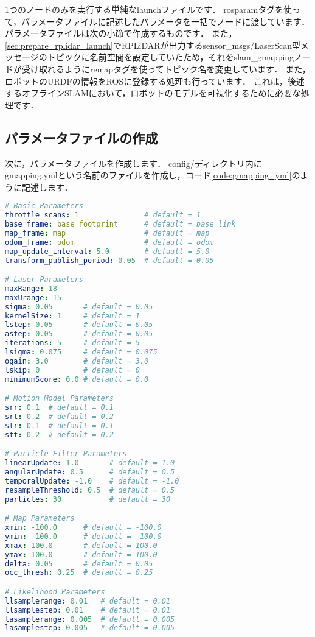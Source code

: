 \documentclass[{../../master}]{subfiles}
\begin{document}
1つのノードのみを実行する単純なlaunchファイルです．
\textsf{rosparam}タグを使って，パラメータファイルに記述したパラメータを一括でノードに渡しています．
パラメータファイルは次の小節で作成するものです．
また，\ref{sec:prepare_rplidar_launch}でRPLiDARが出力する\textsf{sensor\_msgs/LaserScan}型メッセージのトピックに名前空間を設定していたため，それを\textsf{slam\_gmapping}ノードが受け取れるように\textsf{remap}タグを使ってトピック名を変更しています．
また，ロボットのURDFの情報をROSに登録する処理も行っています．
これは，後述するオフラインSLAMにおいて，ロボットのモデルを可視化するために必要な処理です．

\subsection{パラメータファイルの作成}

次に，パラメータファイルを作成します．
\textsf{config/}ディレクトリ内に\textsf{gmapping.yml}という名前のファイルを作成し，コード\ref{code:gmapping_yml}のように記述します．

\begin{lstlisting}[language=YAML, label=code:gmapping_yml, caption=\textsf{gmapping.yml}]
# Basic Parameters
throttle_scans: 1               # default = 1
base_frame: base_footprint      # default = base_link
map_frame: map                  # default = map
odom_frame: odom                # default = odom
map_update_interval: 5.0        # default = 5.0
transform_publish_period: 0.05  # default = 0.05

# Laser Parameters
maxRange: 18
maxUrange: 15
sigma: 0.05       # default = 0.05
kernelSize: 1     # default = 1
lstep: 0.05       # default = 0.05
astep: 0.05       # default = 0.05
iterations: 5     # default = 5
lsigma: 0.075     # default = 0.075
ogain: 3.0        # default = 3.0
lskip: 0          # default = 0
minimumScore: 0.0 # default = 0.0

# Motion Model Parameters
srr: 0.1  # default = 0.1
srt: 0.2  # default = 0.2
str: 0.1  # default = 0.1
stt: 0.2  # default = 0.2

# Particle Filter Parameters
linearUpdate: 1.0       # default = 1.0
angularUpdate: 0.5      # default = 0.5
temporalUpdate: -1.0    # default = -1.0
resampleThreshold: 0.5  # default = 0.5
particles: 30           # default = 30

# Map Parameters
xmin: -100.0      # default = -100.0
ymin: -100.0      # default = -100.0
xmax: 100.0       # default = 100.0
ymax: 100.0       # default = 100.0
delta: 0.05       # default = 0.05
occ_thresh: 0.25  # default = 0.25

# Likelihood Parameters
llsamplerange: 0.01   # default = 0.01
llsamplestep: 0.01    # default = 0.01
lasamplerange: 0.005  # default = 0.005
lasamplestep: 0.005   # default = 0.005
\end{lstlisting}
\end{document}
